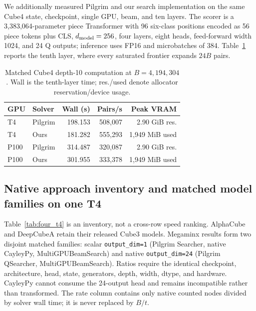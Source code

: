 \documentclass[10pt,twocolumn]{article}
\begin{document}
We additionally measured Pilgrim and our search implementation on the same
Cube4 state, checkpoint, single GPU, beam, and ten layers.  The scorer is a
3,383,064-parameter piece Transformer with 96 six-class positions encoded as
56 piece tokens plus CLS,
$d_{\rm model}=256$, four layers, eight heads, feed-forward width 1024, and 24
Q outputs; inference uses FP16 and microbatches of 384.  Table~\ref{tab:cube4_pair}
reports the tenth layer, where every saturated frontier expands $24B$ pairs.

\begin{table}[t]
\centering
\small
\setlength{\tabcolsep}{2pt}
\caption{Matched Cube4 depth-10 computation at $B=4{,}194{,}304$.
Wall is the tenth-layer time; res./used denote allocator reservation/device usage.}
\label{tab:cube4_pair}
\begin{tabular}{@{}llrrr@{}}
\toprule
GPU & Solver & Wall (s) & Pairs/s & Peak VRAM \\
\midrule
T4 & Pilgrim & 198.153 & 508,007 & 2.90 GiB res. \\
T4 & Ours & 181.282 & 555,293 & 1,949 MiB used \\
P100 & Pilgrim & 314.487 & 320,087 & 2.90 GiB res. \\
P100 & Ours & 301.955 & 333,378 & 1,949 MiB used \\
\bottomrule
\end{tabular}
\end{table}

\subsection{Native approach inventory and matched model families on one T4}
Table~\ref{tab:four_t4} is an inventory, not a cross-row speed ranking.
AlphaCube and DeepCubeA retain their released Cube3 models. Megaminx results
form two disjoint matched families: scalar \texttt{output\_dim=1} (Pilgrim
Searcher, native CayleyPy, MultiGPUBeamSearch) and native
\texttt{output\_dim=24} (Pilgrim QSearcher, MultiGPUBeamSearch). Ratios require
the identical checkpoint, architecture, head, state, generators, depth, width,
dtype, and hardware. CayleyPy cannot consume the 24-output head and remains
incompatible rather than transformed.
The rate column contains only native counted nodes divided by solver wall time;
it is never replaced by $B/t$.
\end{document}
